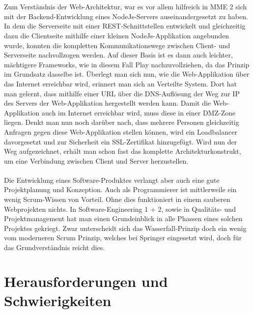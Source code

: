 \\
\\
Zum Verständnis der Web-Architektur, war es vor allem hilfreich in MME 2 sich mit der Backend-Entwicklung eines NodeJs-Servers auseinandergesetzt zu haben. In dem die Serverseite mit einer REST-Schnittstellen entwickelt und gleichzeitig dazu die Clientseite mithilfe einer kleinen NodeJs-Applikation angebunden wurde, konnten die kompletten Kommunikationswege zwischen Client- und Serverseite nachvollzogen werden. Auf dieser Basis ist es dann auch leichter, mächtigere Frameworks, wie in diesem Fall Play nachzuvollziehen, da das Prinzip im Grundsatz dasselbe ist. Überlegt man sich nun, wie die Web-Applikation über das Internet erreichbar wird, erinnert man sich an Verteilte System. Dort hat man gelernt, dass mithilfe einer URL über die DNS-Auflösung der Weg zur IP des Servers der Web-Applikation hergestellt werden kann. Damit die Web-Applikation auch im Internet erreichbar wird, muss diese in einer DMZ-Zone liegen. Denkt man nun noch darüber nach, dass mehrere Personen gleichzeitig Anfragen gegen diese Web-Applikation stellen können, wird ein Loadbalancer davorgesetzt und zur Sicherheit ein SSL-Zertifikat hinzugefügt. Wird nun der Weg aufgezeichnet, erhält man schon fast das komplette Architekturkonstrukt, um eine Verbindung zwischen Client und Server herzustellen. 
\\
\\
Die Entwicklung eines Software-Produktes verlangt aber auch eine gute Projektplanung und Konzeption. Auch als Programmierer ist mittlerweile ein wenig Scrum-Wissen von Vorteil. Ohne dies funktioniert in einem sauberen Webprojekten nichts. In Software-Engineering 1 + 2, sowie in Qualitäts- und Projektmanagement hat man einen Grundeinblick in alle Phassen eines solchen Projektes gekriegt. Zwar unterscheidt sich das Wasserfall-Prinzip doch ein wenig vom moderneren Scrum Prinzip, welches bei Springer eingesetzt wird, doch für das Grundverständnis reicht dies. 

\section{Herausforderungen und Schwierigkeiten}
\label{sec:Fazit:HS}

